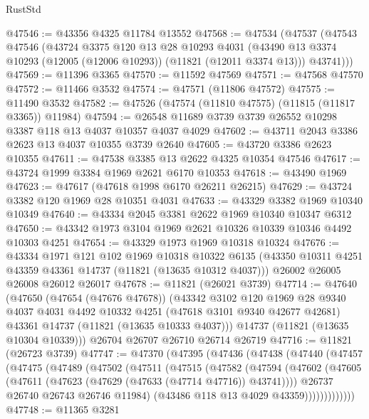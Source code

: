\begin{lexlean}{RustStd}
\begin{coremodule}
@47546 := @43356 @4325 @11784 @13552
@47568 := @47534
    (@47537
      (@47543
        @47546
        (@43724
          @3375
          @120
          @13
          @28
          @10293
          @4031
          (@43490 @13 @3374 @10293 (@12005 (@12006 @10293)) (@11821 (@12011 @3374 @13)))
          @43741)))
@47569 := @11396 @3365
@47570 := @11592 @47569
@47571 := @47568 @47570
@47572 := @11466 @3532
@47574 := @47571 (@11806 @47572)
@47575 := @11490 @3532
@47582 := @47526 (@47574 (@11810 @47575) (@11815 (@11817 @3365)) @11984)
@47594 := @26548 @11689 @3739 @3739 @26552 @10298 @3387 @118 @13 @4037 @10357 @4037 @4029
@47602 := @43711 @2043 @3386 @2623 @13 @4037 @10355 @3739 @2640
@47605 := @43720 @3386 @2623 @10355
@47611 := @47538 @3385 @13 @2622 @4325 @10354 @47546
@47617 := @43724 @1999 @3384 @1969 @2621 @6170 @10353
@47618 := @43490 @1969
@47623 := @47617 (@47618 @1998 @6170 @26211 @26215)
@47629 := @43724 @3382 @120 @1969 @28 @10351 @4031
@47633 := @43329 @3382 @1969 @10340 @10349
@47640 := @43334 @2045 @3381 @2622 @1969 @10340 @10347 @6312
@47650 := @43342 @1973 @3104 @1969 @2621 @10326 @10339 @10346 @4492 @10303 @4251
@47654 := @43329 @1973 @1969 @10318 @10324
@47676 := @43334
    @1971
    @121
    @102
    @1969
    @10318
    @10322
    @6135
    (@43350 @10311 @4251 @43359 @43361 @14737 (@11821 (@13635 @10312 @4037)))
    @26002
    @26005
    @26008
    @26012
    @26017
@47678 := @11821 (@26021 @3739)
@47714 := @47640
    (@47650
      (@47654 (@47676 @47678))
      (@43342
        @3102
        @120
        @1969
        @28
        @9340
        @4037
        @4031
        @4492
        @10332
        @4251
        (@47618 @3101 @9340 @42677 @42681)
        @43361
        @14737
        (@11821 (@13635 @10333 @4037)))
      @14737
      (@11821 (@13635 @10304 @10339)))
    @26704
    @26707
    @26710
    @26714
    @26719
@47716 := @11821 (@26723 @3739)
@47747 := @47370
    (@47395
      (@47436
        (@47438
          (@47440
            (@47457
              (@47475
                (@47489
                  (@47502
                    (@47511
                      (@47515
                        (@47582
                          (@47594
                            (@47602
                              (@47605 (@47611 (@47623 (@47629 (@47633 (@47714 @47716)) @43741))))
                              @26737
                              @26740
                              @26743
                              @26746
                              @11984)
                            (@43486 @118 @13 @4029 @43359)))))))))))))
@47748 := @11365 @3281

\end{coremodule}
\end{lexlean}
